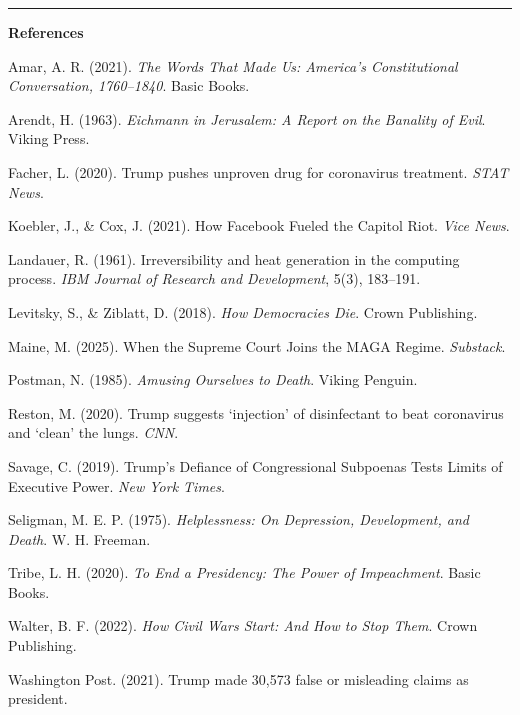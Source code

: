 \begin{center}\rule{0.5\linewidth}{0.5pt}\end{center}

\textbf{References}

Amar, A. R. (2021). \emph{The Words That Made Us: America's
Constitutional Conversation, 1760--1840}. Basic Books.

Arendt, H. (1963). \emph{Eichmann in Jerusalem: A Report on the Banality
of Evil}. Viking Press.

Facher, L. (2020). Trump pushes unproven drug for coronavirus treatment.
\emph{STAT News}.

Koebler, J., \& Cox, J. (2021). How Facebook Fueled the Capitol Riot.
\emph{Vice News}.

Landauer, R. (1961). Irreversibility and heat generation in the
computing process. \emph{IBM Journal of Research and Development}, 5(3),
183--191.

Levitsky, S., \& Ziblatt, D. (2018). \emph{How Democracies Die}. Crown
Publishing.

Maine, M. (2025). When the Supreme Court Joins the MAGA Regime.
\emph{Substack}.

Postman, N. (1985). \emph{Amusing Ourselves to Death}. Viking Penguin.

Reston, M. (2020). Trump suggests `injection' of disinfectant to beat
coronavirus and `clean' the lungs. \emph{CNN}.

Savage, C. (2019). Trump's Defiance of Congressional Subpoenas Tests
Limits of Executive Power. \emph{New York Times}.

Seligman, M. E. P. (1975). \emph{Helplessness: On Depression,
Development, and Death}. W. H. Freeman.

Tribe, L. H. (2020). \emph{To End a Presidency: The Power of
Impeachment}. Basic Books.

Walter, B. F. (2022). \emph{How Civil Wars Start: And How to Stop Them}.
Crown Publishing.

Washington Post. (2021). Trump made 30,573 false or misleading claims as
president.
